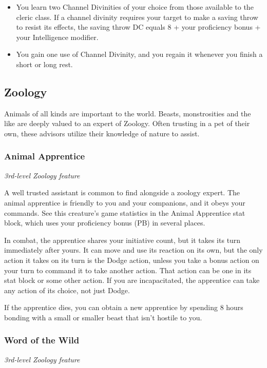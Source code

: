 \documentclass[letterpaper,openany,twoside,twocolumn]{book}
\begin{document}
	\begin{itemize}
		\item You learn two Channel Divinities of your choice from those available to the cleric class. If a channel divinity requires your target to make a saving throw to resist its effects, the saving throw DC equals 8 + your proficiency bonus + your Intelligence modifier.
		\item You gain one use of Channel Divinity, and you regain it whenever you finish a short or long rest.
	\end{itemize}
	
	\subsection*{Zoology}
	Animals of all kinds are important to the world. Beasts, monstrosities and the like are deeply valued to an expert of Zoology. Often trusting in a pet of their own, these advisors utilize their knowledge of nature to assist.
	
	\subsubsection*{Animal Apprentice}
	\textnormal{\textit{3rd-level Zoology feature}}
	
	A well trusted assistant is common to find alongside a zoology expert. The animal apprentice is friendly to you and your companions, and it obeys your commands. See this creature's game statistics in the Animal Apprentice stat block, which uses your proficiency bonus (PB) in several places.
	
	In combat, the apprentice shares your initiative count, but it takes its turn immediately after yours. It can move and use its reaction on its own, but the only action it takes on its turn is the Dodge action, unless you take a bonus action on your turn to command it to take another action. That action can be one in its stat block or some other action. If you are incapacitated, the apprentice can take any action of its choice, not just Dodge.
	
	If the apprentice dies, you can obtain a new apprentice by spending 8 hours bonding with a small or smaller beast that isn't hostile to you.
	
	\subsubsection*{Word of the Wild}
	\textnormal{\textit{3rd-level Zoology feature}}
	
\end{document}
